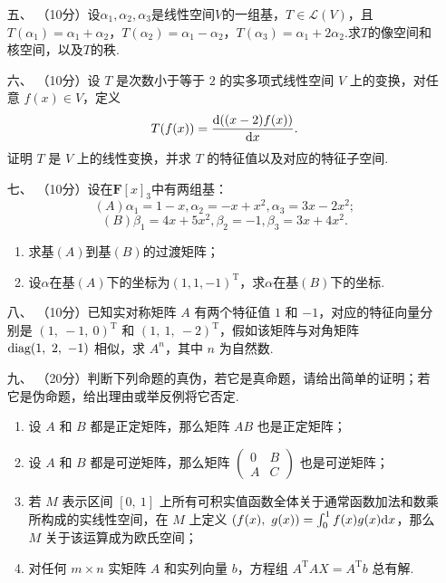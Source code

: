 \begin{enumerate}
	\item[五、]（10分）设$\alpha_1,\alpha_2,\alpha_3$是线性空间$V$的一组基，$T\in\mathcal{L}(V)$，且$T(\alpha_1)=\alpha_1+\alpha_2$，$T(\alpha_2)=\alpha_1-\alpha_2$，$T(\alpha_3)=\alpha_1+2\alpha_2$.求$T$的像空间和核空间，以及$T$的秩.
	\item[六、]（10分）设 $T$ 是次数小于等于 $2$ 的实多项式线性空间 $V$ 上的变换，对任意 $f(x) \in V$，定义
    \[T(f(x))=\frac{\textup{d}((x-2)f(x))}{\textup{d}x}.\]
    证明 $T$ 是 $V$ 上的线性变换，并求 $T$ 的特征值以及对应的特征子空间.
	\item[七、]（10分）设在$\mathbf{F}[x]_3$中有两组基：
	\[(A)\alpha_1=1-x,\alpha_2=-x+x^2,\alpha_3=3x-2x^2;\]
    \[(B)\beta_1=4x+5x^2,\beta_2=-1,\beta_3=3x+4x^2.\]
    \begin{enumerate}[label=(\arabic*)]
        \item 求基$(A)$到基$(B)$的过渡矩阵；
        \item 设$\alpha$在基$(A)$下的坐标为$(1,1,-1)^{\mathrm{T}}$，求$\alpha$在基$(B)$下的坐标.
    \end{enumerate}
    \item[八、]（10分）已知实对称矩阵 $A$ 有两个特征值 $1$ 和 $-1$，对应的特征向量分别是 $(1,\ -1,\ 0)^\mathrm{T}$ 和 $(1,\ 1,\ -2)^\mathrm{T}$，假如该矩阵与对角矩阵 $\textup{diag}(1,\ 2,\ -1)$ 相似，求 $A^n$，其中 $n$ 为自然数.
	\item[九、]（20分）判断下列命题的真伪，若它是真命题，请给出简单的证明；若它是伪命题，给出理由或举反例将它否定.
    \begin{enumerate}[label=(\arabic*)]
        \item 设 $A$ 和 $B$ 都是正定矩阵，那么矩阵 $AB$ 也是正定矩阵；
        \item 设 $A$ 和 $B$ 都是可逆矩阵，那么矩阵 $\begin{pmatrix}0 & B \\ A & C\end{pmatrix}$ 也是可逆矩阵；
        \item 若 $M$ 表示区间 $[0,\ 1]$ 上所有可积实值函数全体关于通常函数加法和数乘所构成的实线性空间，在 $M$ 上定义 $(f(x),\ g(x))=\int_0^1f(x)g(x)\textup{d}x$，那么 $M$ 关于该运算成为欧氏空间；
        \item 对任何 $m \times n$ 实矩阵 $A$ 和实列向量 $b$，方程组 $A^\mathrm{T}AX=A^\mathrm{T}b$ 总有解.
    \end{enumerate}
\end{enumerate}

\newpage
